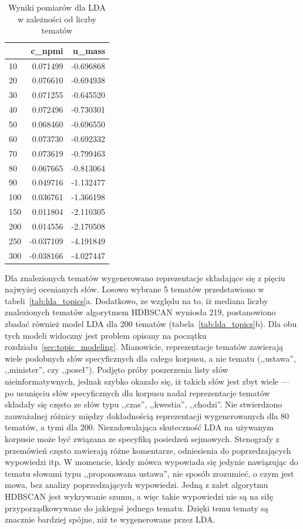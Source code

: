 	\begin{table}[htb]
		\centering
		\caption{Wyniki pomiarów dla LDA w zależności od liczby tematów}\label{tab:lda_scores}
		\begin{tabular}{lrr}
			\toprule
			{} &    c\_npmi &    u\_mass \\
			\midrule
			10  &  0.071499 & -0.696868 \\
			20  &  0.076610 & -0.694938 \\
			30  &  0.071255 & -0.645520 \\
			40  &  0.072496 & -0.730301 \\
			50  &  0.068460 & -0.696550 \\
			60  &  0.073730 & -0.692332 \\
			70  &  0.073619 & -0.799463 \\
			80  &  0.067665 & -0.813064 \\
			90  &  0.049716 & -1.132477 \\
			100 &  0.036761 & -1.366198 \\
			150 &  0.011804 & -2.110305 \\
			200 &  0.014556 & -2.170508 \\
			250 & -0.037109 & -4.191849 \\
			300 & -0.038166 & -4.027447 \\
			\bottomrule
		\end{tabular}
	\end{table}

	Dla znalezionych tematów wygenerowano reprezentacje składające się z pięciu najwyżej ocenianych słów.
	Losowo wybrane 5 tematów przedstawiono w tabeli~\ref{tab:lda_topics}a.
	Dodatkowo, ze względu na to, iż mediana liczby znalezionych tematów algorytmem HDBSCAN wyniosła 219,
		postanowiono zbadać również model LDA dla 200 tematów (tabela~\ref{tab:lda_topics}b).
	Dla obu tych modeli widoczny jest problem opisany na początku rozdziału~\ref{sec:topic_modeling}.
	Mianowicie, reprezentacje tematów zawierają wiele podobnych słów specyficznych dla całego korpusu, a nie tematu (,,ustawa'', ,,minister'', czy ,,poseł'').
	Podjęto próby poszerzenia listy słów nieinformatywnych, jednak szybko okazało się, iż takich słów jest zbyt wiele
		--- po usunięciu słów specyficznych dla korpusu nadal reprezentacje tematów składały się często ze słów typu ,,czas'', ,,kwestia'', ,,chodzi''.
	Nie stwierdzono zauważalnej różnicy między dokładnością reprezentacji wygenerowanych dla 80 tematów, a tymi dla 200.
	Niezadowalająca skuteczność LDA na używanym korpusie może być związana ze specyfiką posiedzeń sejmowych.
	Stenografy z przemówień często zawierają różne komentarze, odniesienia do poprzedzających wypowiedzi itp.
	W momencie, kiedy mówca wypowiada się jedynie nawiązując do tematu słowami typu ,,proponowana ustawa'',
		nie sposób zrozumieć, o czym jest mowa, bez analizy poprzedzających wypowiedzi.
	Jedną z zalet algorytmu HDBSCAN jest wykrywanie szumu, a więc takie wypowiedzi nie są na siłę przyporządkowywane do jakiegoś jednego tematu.
	Dzięki temu tematy są znacznie bardziej spójne, niż te wygenerowane przez LDA\@.

